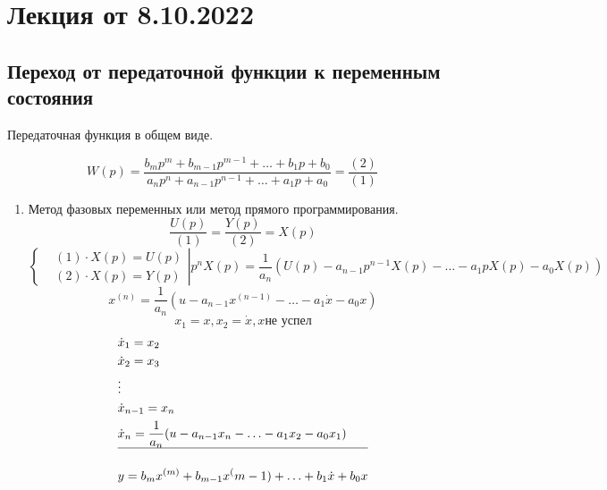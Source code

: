 \section{Лекция от 8.10.2022}
\subsection{Переход от передаточной функции к переменным состояния}
Передаточная функция в общем виде.\par
\[W(p) = \frac{b_mp^m + b_{m-1}p^{m-1} + \ldots + b_1p + b_0}
{a_np^n + a_{n-1}p^{n-1} + \ldots + a_1p +a_0} = \frac{(2)}{(1)}\]
\begin{enumerate}
	\item Метод фазовых переменных или метод прямого программирования.
		\[\frac{U(p)}{(1)} = \frac{Y(p)}{(2)} = X(p)\]
		\[\left\{\begin{aligned} 
				&(1)\cdot X(p) = U(p)\\
				&(2) \cdot X(p) = Y(p)
				    \end{aligned}\right| p^nX(p) = \frac{1}{a_n}(U(p) - a_{n-1}p^{n-1}X(p) - \ldots - a_1pX(p) - a_0X(p))\]
		\[x^{(n)} = \frac{1}{a_n}(u - a_{n-1}x^{(n-1)} - \ldots - a_1 \dot x - a_0x)\]
		\[x_1 = x, x_2 = \dot x, x \text{не успел}\]
		\[\begin{aligned} 
			&\dot x_1 = x_2\\
			&\dot x_2 = x_3\\
			&\vdots\\
			&\dot x_{n-1} = x_n\\
			&\dot x_n = \frac{1}{a_n}(u - a_{n-1}x_n - \ldots - a_1x_2 - a_0x_1)\\
			\hline\\
			&y =  b_mx^{(m)} + b_{m-1}x^(m-1) + \ldots + b_1\dot x + b_0x
		\end{aligned}\]


\end{enumerate}
